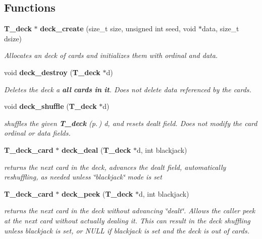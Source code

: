 \subsection*{Functions}
\begin{CompactItemize}
\item 
{\bf T\_\-deck} $\ast$ {\bf deck\_\-create} (size\_\-t size, unsigned int seed, void $\ast$data, size\_\-t dsize)
\begin{CompactList}\small\item\em Allocates an deck of cards and initializes them with ordinal and data.\item\end{CompactList}\item 
void {\bf deck\_\-destroy} ({\bf T\_\-deck} $\ast$d)
\begin{CompactList}\small\item\em Deletes the deck a {\bf all} {\bf cards} {\bf in} {\bf it}. Does not delete data referenced by the cards.\item\end{CompactList}\item 
void {\bf deck\_\-shuffle} ({\bf T\_\-deck} $\ast$d)
\begin{CompactList}\small\item\em shuffles the given {\bf T\_\-deck} {\rm (p.\,\pageref{structT__deck})} d, and resets dealt field. Does not modify the card ordinal or data fields.\item\end{CompactList}\item 
{\bf T\_\-deck\_\-card} $\ast$ {\bf deck\_\-deal} ({\bf T\_\-deck} $\ast$d, int blackjack)
\begin{CompactList}\small\item\em returns the next card in the deck, advances the dealt field, automatically reshuffling, as needed unless \char`\"{}blackjack\char`\"{} mode is set\item\end{CompactList}\item 
{\bf T\_\-deck\_\-card} $\ast$ {\bf deck\_\-peek} ({\bf T\_\-deck} $\ast$d, int blackjack)
\begin{CompactList}\small\item\em returns the next card in the deck without advancing \char`\"{}dealt\char`\"{}. Allows the caller peek at the next card without actually dealing it. This can result in the deck shuffling unless blackjack is set, or NULL if blackjack is set and the deck is out of cards.\item\end{CompactList}\end{CompactItemize}


